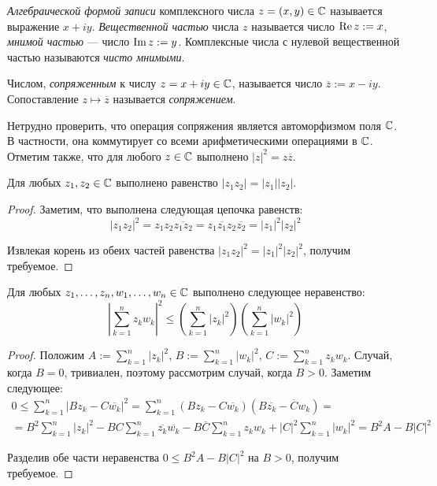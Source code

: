 \begin{definition}
	\textit{Алгебраической формой записи} комплексного числа $z = (x, y) \in \mathbb{C}$ называется выражение $x + iy$. \textit{Вещественной частью} числа $z$ называется число $\operatorname{Re}{z} := x$, \textit{мнимой частью} --- число $\operatorname{Im}{z} := y$. Комплексные числа с нулевой вещественной частью называются \textit{чисто мнимыми}.
\end{definition}

\begin{definition}
	Числом, \textit{сопряженным} к числу $z = x + iy \in \mathbb{C}$, называется число $\overline{z} := x - iy$. Сопоставление $z \mapsto \overline{z}$ называется \textit{сопряжением}.
\end{definition}

\begin{note}
	Нетрудно проверить, что операция сопряжения является автоморфизмом поля $\mathbb{C}$. В частности, она коммутирует со всеми арифметическими операциями в $\mathbb{C}$. Отметим также, что для любого $z \in \mathbb{C}$ выполнено $|z|^2 = z\overline{z}$.
\end{note}

\begin{proposition}
	Для любых $z_1, z_2 \in \mathbb{C}$ выполнено равенство $|z_1z_2| = |z_1||z_2|$.
\end{proposition}

\begin{proof}
	Заметим, что выполнена следующая цепочка равенств:
	\[|z_1z_2|^2 = z_1z_2\overline{z_1z_2} = z_1\overline{z_1}z_2\overline{z_2} = |z_1|^2|z_2|^2\]
	
	Извлекая корень из обеих частей равенства $|z_1z_2|^2 = |z_1|^2|z_2|^2$, получим требуемое.
\end{proof}

\begin{proposition}
	Для любых $z_1, \dotsc, z_n, w_1, \dotsc, w_n \in \mathbb{C}$ выполнено следующее неравенство:
	\[\left|\sum_{k=1}^nz_kw_k\right|^2 \le \left(\sum_{k=1}^n|z_k|^2\right)\left(\sum_{k=1}^n|w_k|^2\right)\]
\end{proposition}

\begin{proof}
	Положим $A := \sum_{k=1}^n|z_k|^2$, $B := \sum_{k=1}^n|w_k|^2$, $C := \sum_{k=1}^nz_kw_k$. Случай, когда $B = 0$, тривиален, поэтому рассмотрим случай, когда $B > 0$. Заметим следующее:
	\begin{multline*}
		0 \le \sum_{k = 1}^n|Bz_k - C\overline{w_k}|^2 = \sum_{k = 1}^n(Bz_k - C\overline{w_k})(B\overline{z_k} - \overline Cw_k) =
		\\
		= B^2\sum_{k=1}^n|z_k|^2 - BC\sum_{k=1}^n\overline{z_k}\overline{w_k} - B\overline{C}\sum_{k=1}^nz_kw_k + |C|^2\sum_{k=1}^n|w_k|^2 = B^2A - B|C|^2
	\end{multline*}
	
	Разделив обе части неравенства $0 \le B^2A - B|C|^2$ на $B > 0$, получим требуемое.
\end{proof}

